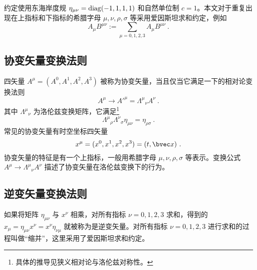 

约定使用东海岸度规 $\eta_{\mu\nu}=\rm{diag}(-1,1,1,1)$ 和自然单位制 $c=1$。本文对于重复出现在上指标和下指标的希腊字母 $\mu,\nu,\rho,\sigma$ 等采用爱因斯坦求和约定，例如
\begin{equation}
A_\mu B^{\mu\nu}:= \sum_{\mu=0,1,2,3}A_\mu B^{\mu\nu} ~.
\end{equation}

\subsection{协变矢量变换法则}
四矢量 $A^\mu=(A^0,A^1,A^2,A^3)$ 被称为协变矢量，当且仅当它满足一下的相对论变换法则
\begin{equation}\label{eq_vecspr_1}
A^\mu\rightarrow {A'}^\mu = \Lambda^{\mu}{}_\nu A^\nu~.
\end{equation}
其中 $\Lambda^\mu{}_\nu$ 为洛伦兹变换矩阵，它满足\footnote{具体的推导见狭义相对论与洛伦兹对称性。}
\begin{equation}\label{eq_vecspr_2}
\Lambda^{\mu}{}_{\rho} \Lambda^{\nu}{}_{\sigma} \eta_{\mu\nu} = \eta_{\rho\sigma}~.
\end{equation}
常见的协变矢量有时空坐标四矢量
\begin{equation}
x^\mu = (x^0,x^1,x^2,x^3) = (t,\bvec x)~.
\end{equation}
协变矢量的特征是有一个上指标，一般用希腊字母 $\mu,\nu,\rho,\sigma$ 等表示。变换公式 $A^\mu\rightarrow \Lambda^{\mu}{}_\nu A^\nu$ 描述了协变矢量在洛伦兹变换下的行为。

\subsection{逆变矢量变换法则}
如果将矩阵 $\eta_{\mu\nu}$ 与 $x^\nu$ 相乘，对所有指标 $\nu=0,1,2,3$ 求和，得到的 $x_\mu =\eta_{\mu\nu} x^\nu = x^\nu\eta_{\nu\mu}$ 就被称为是逆变矢量。对所有指标 $\nu=0,1,2,3$ 进行求和的过程叫做“缩并”，这里采用了爱因斯坦求和约定。

